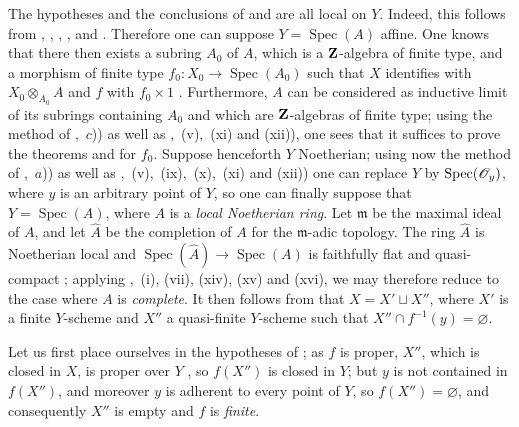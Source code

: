 \begin{env}[8.11.4]
\label{IV.8.11.4}
The hypotheses and the conclusions of  and  are all local on $Y$.
Indeed, this follows from , , , , and .
Therefore one can suppose $Y=\operatorname{Spec}(A)$ affine.
One knows that there then exists a subring $A_0$ of $A$, which is a $\mathbf{Z}$-algebra of finite type, and a morphism of finite type $f_0:X_0\to\operatorname{Spec}(A_0)$ such that $X$ identifies with $X_0\otimes_{A_0}A$ and $f$ with $f_0\times 1$ .
Furthermore, $A$ can be considered as inductive limit of its subrings containing $A_0$ and which are $\mathbf{Z}$-algebras of finite type; using the method of ,~$c$)) as well as ,~(v),~(xi) and (xii)), one sees that it suffices to prove the theorems  and  for $f_0$.
Suppose henceforth $Y$ Noetherian; using now the method of ,~$a$)) as well as ,~(v),~(ix),~(x),~(xi) and (xii)) one can replace $Y$ by $\operatorname{Spec}(\mathscr{O}_y)$, where $y$ is an
arbitrary point of $Y$, so one can finally suppose that $Y=\operatorname{Spec}(A)$, where $A$ is a \emph{local Noetherian ring}.
Let $\mathfrak{m}$ be the maximal ideal of $A$, and let $\hat{A}$ be the completion of $A$ for the $\mathfrak{m}$-adic topology. The ring $\hat{A}$ is Noetherian local and $\operatorname{Spec}(\hat{A})\to\operatorname{Spec}(A)$ is faithfully flat and quasi-compact ; applying ,~(i), (vii), (xiv), (xv) and (xvi), we may therefore reduce to the case where $A$ is \emph{complete}.
It then follows from  that $X=X'\sqcup X''$, where $X'$ is a finite $Y$-scheme and $X''$ a quasi-finite $Y$-scheme such that $X''\cap f^{-1}(y)=\varnothing$.
\end{env}

Let us first place ourselves in the hypotheses of ; as $f$ is proper, $X''$, which is closed in $X$, is proper over $Y$ , so $f(X'')$ is closed in $Y$; but $y$ is not contained in $f(X'')$, and moreover $y$ is adherent to every point of $Y$, so $f(X'')=\varnothing$, and consequently $X''$ is empty and $f$ is \emph{finite}.

